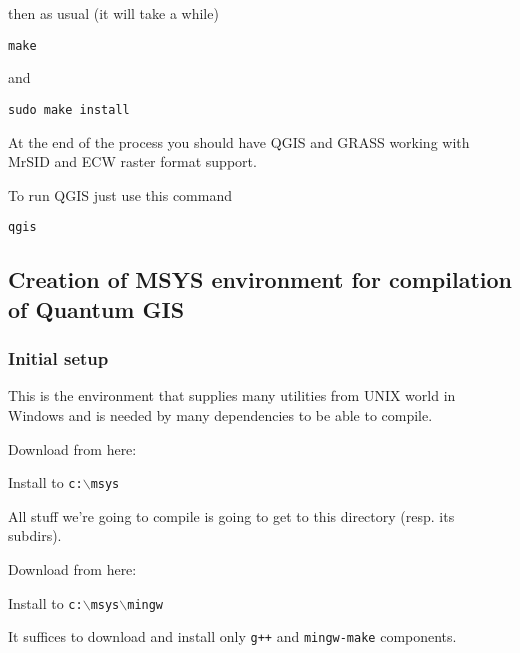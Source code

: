 then as usual (it will take a while)

\begin{verbatim}
make
\end{verbatim}

and

\begin{verbatim}
sudo make install
\end{verbatim}

At the end of the process you should have QGIS and GRASS working with MrSID and ECW
raster format support.

To run QGIS just use this command 

\begin{verbatim}
qgis
\end{verbatim}


\subsection{Creation of MSYS environment for compilation of Quantum GIS}
\subsubsection{Initial setup}
This is the environment that supplies many utilities from UNIX world in Windows and is needed
by many dependencies to be able to compile.

Download from here:

	\begin{quotation}
	\end{quotation}

Install to \texttt{c:$\backslash$msys}

All stuff we're going to compile is going to get to this directory (resp. its subdirs).

Download from here:

	\begin{quotation}
	\end{quotation}

Install to \texttt{c:$\backslash$msys$\backslash$mingw}

It suffices to download and install only \texttt{g++} and \texttt{mingw-make} components.

